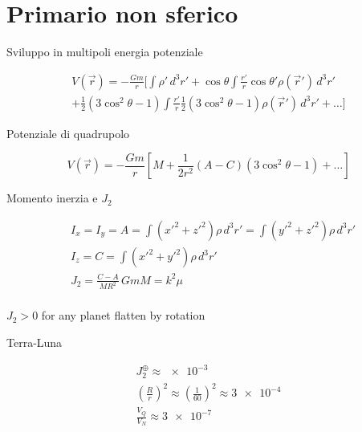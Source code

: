 \section{Primario non sferico}

\begin{frame}{Sviluppo in multipoli energia potenziale}

\begin{align*}
V(\vec{r})=-\frac{Gm}{r}[\int\rho'\,d^3r'+\cos{\theta}\int\frac{r'}{r}\cos{\theta'}\rho(\vec{r}')\,d^3r'\\
+\frac{1}{2}(3\cos^2{\theta}-1)\int\frac{r'}{r}\frac{1}{2}(3\cos^2{\theta}-1)\rho(\vec{r}')\,d^3r'+\ldots]
\end{align*}

\begin{block}{Potenziale di quadrupolo}

\begin{equation*}
V(\vec{r})=-\frac{Gm}{r}[M+\frac{1}{2r^2}(A-C)(3\cos^2{\theta}-1)+\ldots]
\end{equation*}

\end{block}

\end{frame}

\begin{wordonframe}{Momento inerzia e $J_2$}

\begin{align*}
&I_x=I_y=A=\int(x'^2+z'^2)\rho\,d^3r'=\int(y'^2+z'^2)\rho\,d^3r'\\
&I_z=C=\int(x'^2+y'^2)\rho\,d^3r'\\
&J_2=\frac{C-A}{MR^2}\, GmM=k^2\mu\\
\end{align*}

$J_2>0$ for any planet flatten by rotation

\begin{block}{Terra-Luna}

\begin{align*}
J_2^{\oplus}\approx\num{e-3}\\
(\frac{R}{r})^2\approx(\frac{1}{60})^2\approx\num{3e-4}\\
\frac{V_Q}{V_N}\approx\num{3e-7}
\end{align*}

\end{block}

\end{wordonframe}


